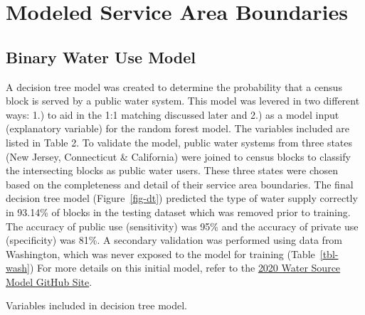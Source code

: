 \documentclass[
  letterpaper,
  DIV=11,
  numbers=noendperiod,
  oneside]{scrartcl}
\begin{document}
\section{Modeled Service Area
Boundaries}\label{modeled-service-area-boundaries}

\subsection{Binary Water Use Model}\label{binary-water-use-model}

A decision tree model was created to determine the probability that a
census block is served by a public water system. This model was levered
in two different ways: 1.) to aid in the 1:1 matching discussed later
and 2.) as a model input (explanatory variable) for the random forest
model. The variables included are listed in Table 2. To validate the
model, public water systems from three states (New Jersey, Connecticut
\& California) were joined to census blocks to classify the intersecting
blocks as public water users. These three states were chosen based on
the completeness and detail of their service area boundaries. The final
decision tree model (Figure~\ref{fig-dt}) predicted the type of water
supply correctly in 93.14\% of blocks in the testing dataset which was
removed prior to training. The accuracy of public use (sensitivity) was
95\% and the accuracy of private use (specificity) was 81\%. A secondary
validation was performed using data from Washington, which was never
exposed to the model for training (Table~\ref{tbl-wash}) For more
details on this initial model, refer to the
\href{https://github.com/USEPA/ORD_Water_Source_2020}{2020 Water Source
Model GitHub Site}.

\begin{table}

\caption{\label{tbl-importance}Variables included in decision tree
model.}


\end{table}%
\end{document}

